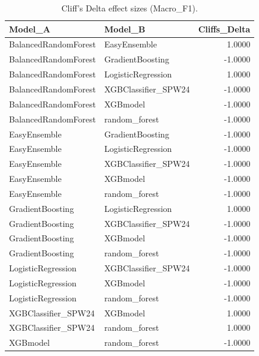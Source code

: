 \begin{table}[t]
\centering
\begin{tabular}{llr}
\toprule
Model_A & Model_B & Cliffs_Delta \\
\midrule
BalancedRandomForest & EasyEnsemble & 1.0000 \\
BalancedRandomForest & GradientBoosting & -1.0000 \\
BalancedRandomForest & LogisticRegression & 1.0000 \\
BalancedRandomForest & XGBClassifier_SPW24 & -1.0000 \\
BalancedRandomForest & XGBmodel & -1.0000 \\
BalancedRandomForest & random_forest & -1.0000 \\
EasyEnsemble & GradientBoosting & -1.0000 \\
EasyEnsemble & LogisticRegression & -1.0000 \\
EasyEnsemble & XGBClassifier_SPW24 & -1.0000 \\
EasyEnsemble & XGBmodel & -1.0000 \\
EasyEnsemble & random_forest & -1.0000 \\
GradientBoosting & LogisticRegression & 1.0000 \\
GradientBoosting & XGBClassifier_SPW24 & -1.0000 \\
GradientBoosting & XGBmodel & -1.0000 \\
GradientBoosting & random_forest & -1.0000 \\
LogisticRegression & XGBClassifier_SPW24 & -1.0000 \\
LogisticRegression & XGBmodel & -1.0000 \\
LogisticRegression & random_forest & -1.0000 \\
XGBClassifier_SPW24 & XGBmodel & 1.0000 \\
XGBClassifier_SPW24 & random_forest & 1.0000 \\
XGBmodel & random_forest & -1.0000 \\
\bottomrule
\end{tabular}
\caption{Cliff's Delta effect sizes (Macro_F1).}
\label{tab:cliffs_Macro_F1}
\end{table}